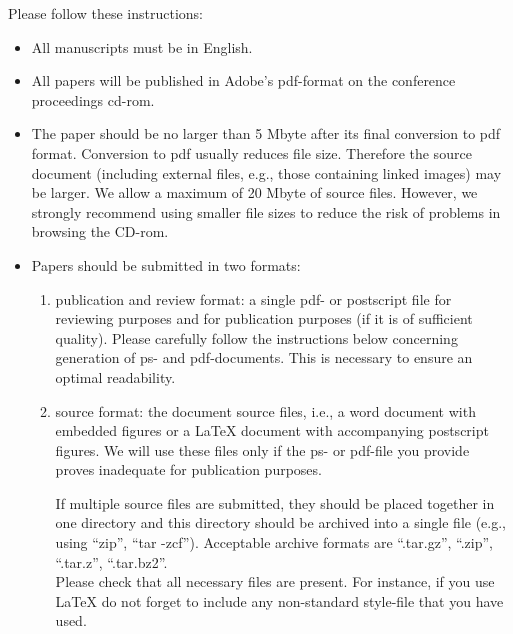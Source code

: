 \documentclass{article}
\begin{document}
Please follow these  instructions:
\begin{itemize}
\item All manuscripts must be in English.
\item All papers will be published in Adobe's pdf-format on the conference proceedings cd-rom.
\item The paper should be no larger than 5 Mbyte after its final conversion to pdf format. Conversion to pdf usually reduces file size. Therefore the source document (including external files, e.g., those containing linked images) may be larger. We allow a maximum of 20 Mbyte of source files. However, we strongly recommend using smaller file sizes to reduce the risk of problems in browsing the CD-rom.
\item Papers should be submitted in two formats:
  \begin{enumerate}
  \item publication and review format: a single pdf- or postscript
    file for reviewing purposes and for publication purposes (if it is
    of sufficient quality). Please carefully follow the instructions
    below concerning generation of ps- and pdf-documents. This is
    necessary to ensure an optimal readability. 
  \item source format: the document source files, i.e., a word
    document with embedded figures or a LaTeX document with
    accompanying postscript figures. We will use these files only if
    the ps- or pdf-file you provide proves inadequate for publication
    purposes.  
    \par
    If multiple source files are submitted, they should be placed
    together in one directory and this directory should be archived
    into a single file (e.g., using ``zip'', ``tar -zcf''). Acceptable
    archive formats are ``.tar.gz'', ``.zip'', ``.tar.z'',
    ``.tar.bz2''.\\
    Please check that all necessary files are present. For
    instance, if you use LaTeX do not forget to include any
    non-standard style-file that you have used.  
    
  \end{enumerate}
\end{itemize}
\end{document}
